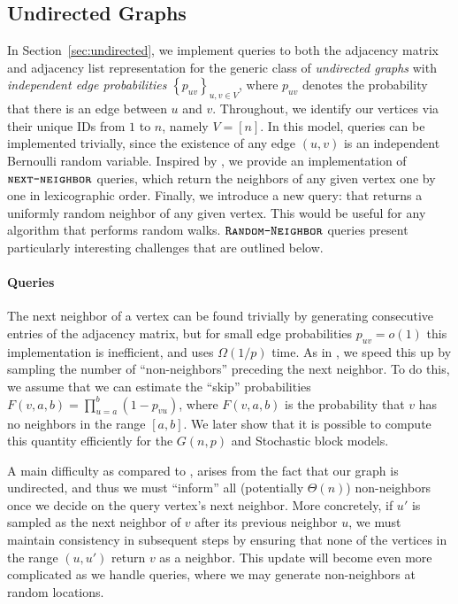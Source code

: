 \subsection{Undirected Graphs}
\label{sec:undirected_graphs}
In Section~\ref{sec:undirected}, we implement queries to both the adjacency matrix and adjacency list representation
for the generic class of \emph{undirected graphs} with {\em independent edge probabilities} $\left\{ p_{uv} \right\}_{u,v\in V}$,
where $p_{uv}$ denotes the probability that there is an edge between $u$ and $v$.
Throughout, we identify our vertices via their unique IDs from $1$ to $n$, namely $V = [n]$.
In this model,  queries can be implemented trivially,
since the existence of any edge $(u,v)$ is an independent Bernoulli random variable.
Inspired by \cite{reut}, we provide an implementation of $\texttt{\textsc{next-neighbor}}$ queries,
which return the neighbors of any given vertex one by one in lexicographic order.
Finally, we introduce a new query:  that returns a uniformly random neighbor of any given vertex.
This would be useful for any algorithm that performs random walks.
$\texttt{\textsc{Random-Neighbor}}$ queries present particularly interesting challenges that are outlined below.

\paragraph*{ Queries}
\label{par:next_neighbor_queries}
The next neighbor of a vertex can be found trivially by generating consecutive entries of the adjacency matrix,
but for small edge probabilities $p_{uv} = o(1)$ this implementation is inefficient, and uses $\Omega (1/p)$ time.
As in \cite{reut}, we speed this up by sampling the number of ``non-neighbors'' preceding the next neighbor.
To do this, we assume that we can estimate the ``skip'' probabilities $F(v,a,b)=\prod^{b}_{u=a} (1-p_{vu})$,
where $F(v,a,b)$ is the probability that $v$ has no neighbors in the range $[a,b]$.
We later show that it is possible to compute this quantity efficiently for the $G(n,p)$ and Stochastic block models.

A main difficulty as compared to \cite{reut}, arises from the fact that our graph is undirected,
and thus we must ``inform'' all (potentially $\Theta(n)$) non-neighbors once we decide on the query vertex's next neighbor.
More concretely, if $u'$ is sampled as the next neighbor of $v$ after its previous neighbor $u$,
we must maintain consistency in subsequent steps by ensuring that none of the vertices in the range $(u,u')$ return $v$ as a neighbor.
This update will become even more complicated as we handle  queries, where we may generate non-neighbors at random locations.

